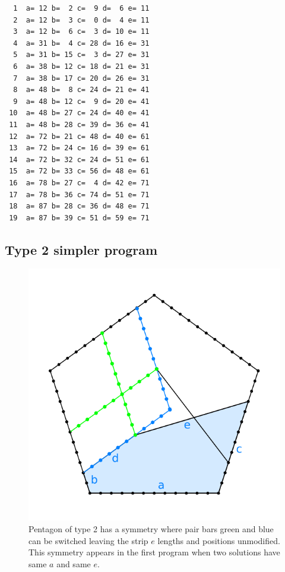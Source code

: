 \documentclass[11pt]{article}
\begin{document}
\begin{lstlisting}
  1  a= 12 b=  2 c=  9 d=  6 e= 11
  2  a= 12 b=  3 c=  0 d=  4 e= 11
  3  a= 12 b=  6 c=  3 d= 10 e= 11
  4  a= 31 b=  4 c= 28 d= 16 e= 31
  5  a= 31 b= 15 c=  3 d= 27 e= 31
  6  a= 38 b= 12 c= 18 d= 21 e= 31
  7  a= 38 b= 17 c= 20 d= 26 e= 31
  8  a= 48 b=  8 c= 24 d= 21 e= 41
  9  a= 48 b= 12 c=  9 d= 20 e= 41
 10  a= 48 b= 27 c= 24 d= 40 e= 41
 11  a= 48 b= 28 c= 39 d= 36 e= 41
 12  a= 72 b= 21 c= 48 d= 40 e= 61
 13  a= 72 b= 24 c= 16 d= 39 e= 61
 14  a= 72 b= 32 c= 24 d= 51 e= 61
 15  a= 72 b= 33 c= 56 d= 48 e= 61
 16  a= 78 b= 27 c=  4 d= 42 e= 71
 17  a= 78 b= 36 c= 74 d= 51 e= 71
 18  a= 87 b= 28 c= 36 d= 48 e= 71
 19  a= 87 b= 39 c= 51 d= 59 e= 71
\end{lstlisting}


\subsection{Type 2 simpler program}

\begin{figure}[h]
\centering
\includegraphics[scale=0.75]{figs/type-2-double}
\caption{Pentagon of type 2 has a symmetry where pair bars green and blue can be switched leaving
the strip $e$ lengths and positions unmodified. This symmetry appears in the first program when two solutions have same $a$ and same $e$.}
\label{fig:type-2-double}
\end{figure}
\end{document}
